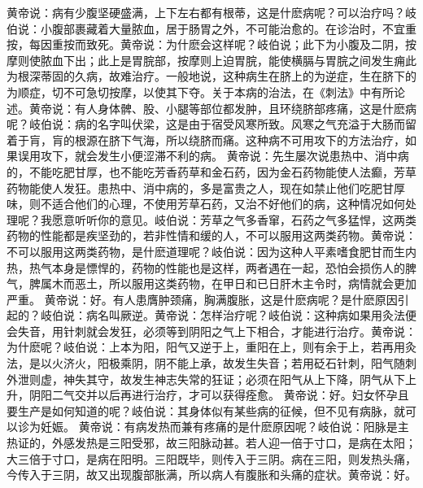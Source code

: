 \documentclass[a4paper,12pt,UTF8,twoside]{ctexbook}
\begin{document}
黄帝说：病有少腹坚硬盛满，上下左右都有根蒂，这是什麽病呢？可以治疗吗？岐伯说：小腹部裹藏着大量脓血，居于肠胃之外，不可能治愈的。在诊治时，不宜重按，每因重按而致死。黄帝说：为什麽会这样呢？岐伯说；此下为小腹及二阴，按摩则使脓血下出；此上是胃脘部，按摩则上迫胃脘，能使横膈与胃脘之间发生痈此为根深蒂固的久病，故难治疗。一般地说，这种病生在脐上的为逆症，生在脐下的为顺症，切不可急切按摩，以使其下夺。关于本病的治法，在《刺法》中有所论述。黄帝说：有人身体髀、股、小腿等部位都发肿，且环绕脐部疼痛，这是什麽病呢？岐伯说：病的名字叫伏梁，这是由于宿受风寒所致。风寒之气充溢于大肠而留着于肓，肓的根源在脐下气海，所以绕脐而痛。这种病不可用攻下的方法治疗，如果误用攻下，就会发生小便涩滞不利的病。
黄帝说：先生屡次说患热中、消中病的，不能吃肥甘厚，也不能吃芳香药草和金石药，因为金石药物能使人法癫，芳草药物能使人发狂。患热中、消中病的，多是富贵之人，现在如禁止他们吃肥甘厚味，则不适合他们的心理，不使用芳草石药，又治不好他们的病，这种情况如何处理呢？我愿意听听你的意见。岐伯说：芳草之气多香窜，石药之气多猛悍，这两类药物的性能都是疾坚劲的，若非性情和缓的人，不可以服用这两类药物。黄帝说：不可以服用这两类药物，是什麽道理呢？岐伯说：因为这种人平素嗜食肥甘而生内热，热气本身是慓悍的，药物的性能也是这样，两者遇在一起，恐怕会损伤人的脾气，脾属木而恶土，所以服用这类药物，在甲日和已日肝木主令时，病情就会更加严重。
黄帝说：好。有人患膺肿颈痛，胸满腹胀，这是什麽病呢？是什麽原因引起的？岐伯说：病名叫厥逆。黄帝说：怎样治疗呢？岐伯说：这种病如果用灸法便会失音，用针刺就会发狂，必须等到阴阳之气上下相合，才能进行治疗。黄帝说：为什麽呢？岐伯说：上本为阳，阳气又逆于上，重阳在上，则有余于上，若再用灸法，是以火济火，阳极乘阴，阴不能上承，故发生失音；若用砭石针刺，阳气随刺外泄则虚，神失其守，故发生神志失常的狂证；必须在阳气从上下降，阴气从下上升，阴阳二气交并以后再进行治疗，才可以获得痊愈。
黄帝说：好。妇女怀孕且要生产是如何知道的呢？岐伯说：其身体似有某些病的征候，但不见有病脉，就可以诊为妊娠。
黄帝说：有病发热而兼有疼痛的是什麽原因呢？岐伯说：阳脉是主热证的，外感发热是三阳受邪，故三阳脉动甚。若人迎一倍于寸口，是病在太阳；大三倍于寸口，是病在阳明。三阳既毕，则传入于三阴。病在三阳，则发热头痛，今传入于三阴，故又出现腹部胀满，所以病人有腹胀和头痛的症状。黄帝说：好。
\end{document}
